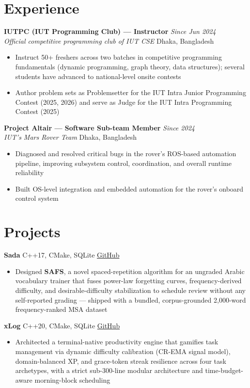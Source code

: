 \documentclass[10.5pt,letterpaper]{article}
\newcommand{\entry}[4]{%
  \textbf{#1} \hfill \textit{#2}\\
  \textit{\color{subtext}#3} \hfill #4\\[1pt]
}
\newcommand{\link}[2]{\href{#1}{\textcolor{accent}{#2}}}
\begin{document}
\section{Experience}

\entry{IUTPC (IUT Programming Club) --- Instructor}{Since Jun 2024}
{Official competitive programming club of IUT CSE}{Dhaka, Bangladesh}
\begin{itemize}
  \item Instruct 50+ freshers across two batches in competitive programming fundamentals (dynamic programming, graph theory, data structures); several students have advanced to national-level onsite contests
  \item Author problem sets as Problemsetter for the IUT Intra Junior Programming Contest (2025, 2026) and serve as Judge for the IUT Intra Programming Contest (2025)
\end{itemize}

\entry{Project Altair --- Software Sub-team Member}{Since 2024}
{IUT's Mars Rover Team}{Dhaka, Bangladesh}
\begin{itemize}
  \item Diagnosed and resolved critical bugs in the rover's ROS-based automation pipeline, improving subsystem control, coordination, and overall runtime reliability
  \item Built OS-level integration and embedded automation for the rover's onboard control system
\end{itemize}

\section{Projects}

\textbf{Sada} \;\textbar\; C++17, CMake, SQLite \;\textbar\; \link{https://github.com/rbwkai/Sada}{GitHub}
\begin{itemize}
  \item Designed \textbf{SAFS}, a novel spaced-repetition algorithm for an ungraded Arabic vocabulary trainer that fuses power-law forgetting curves, frequency-derived difficulty, and desirable-difficulty stabilization to schedule review without any self-reported grading --- shipped with a bundled, corpus-grounded 2,000-word frequency-ranked MSA dataset
\end{itemize}

\textbf{xLog} \;\textbar\; C++20, CMake, SQLite \;\textbar\; \link{https://github.com/rbwkai}{GitHub}
\begin{itemize}
  \item Architected a terminal-native productivity engine that gamifies task management via dynamic difficulty calibration (CR-EMA signal model), domain-balanced XP, and grace-token streak resilience across four task archetypes, with a strict sub-300-line modular architecture and time-budget-aware morning-block scheduling
\end{itemize}
\end{document}
